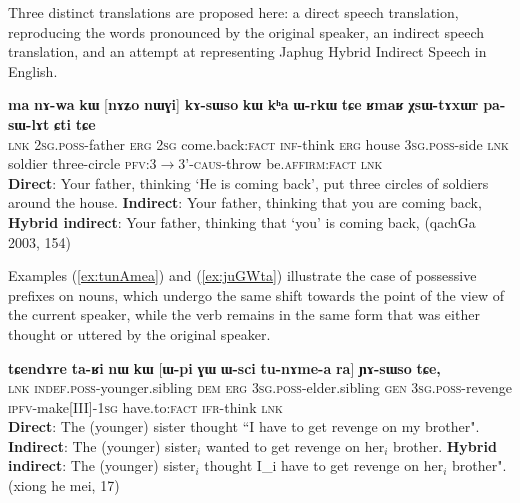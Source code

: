 \documentclass[oneside,a4paper,11pt]{article}
\newcommand{\ipa}[1]{\textbf{\phon#1}} %
\newcommand{\bleu}[1]{{\color{blue}#1}}
\newcommand{\rouge}[1]{{\color{red}#1}}
\newcommand{\refb}[1]{(\ref{#1})}
\begin{document}
Three distinct translations are proposed here: a direct speech translation, reproducing the words pronounced by the original speaker, an indirect speech translation, and an attempt at representing Japhug Hybrid Indirect Speech in English.

\begin{exe}
\ex \label{ex:nWGi.kAsWso}
\gll 
\ipa{ma} \ipa{nɤ-wa}  	\ipa{kɯ}  	[\rouge{\ipa{nɤʑo}} 	\bleu{\ipa{nɯɣi}}]  	\ipa{kɤ-sɯso}  	\ipa{kɯ}  	\ipa{kʰa}  	\ipa{ɯ-rkɯ} \ipa{tɕe} 	\ipa{ʁmaʁ}  	\ipa{χsɯ-tɤxɯr}  	\ipa{pa-sɯ-lɤt}  	\ipa{ɕti}  	\ipa{tɕe}  \\
\textsc{lnk} \textsc{2sg.poss}-father \textsc{erg} \textsc{2sg} {come.back:\textsc{fact}}  \textsc{inf}-think \textsc{erg} house \textsc{3sg.poss}-side \textsc{lnk} soldier three-circle \textsc{pfv:3$\rightarrow$3'-caus}-throw be.\textsc{affirm}:\textsc{fact} \textsc{lnk}\\
\glt \textbf{Direct}: Your father, thinking `\bleu{He is coming back}',   put three circles of soldiers around the house. 
\glt  \textbf{Indirect}: Your father, thinking that \rouge{you are coming back},
\glt  \textbf{Hybrid indirect}: Your father, thinking that `\rouge{you}' \bleu{is coming back}, (qachGa 2003, 154)
\end{exe}
   
Examples \refb{ex:tunAmea} and \refb{ex:juGWta} illustrate the case of possessive prefixes on nouns, which undergo the same shift towards the point of the view of the current speaker, while the verb remains in the same form that was either thought or uttered by the original speaker.

\begin{exe}
\ex \label{ex:tunAmea}
\gll  \ipa{tɕendɤre}  	\ipa{ta-ʁi}  	\ipa{nɯ}  	\ipa{kɯ}  	[\rouge{\ipa{ɯ-pi}}  	\ipa{ɣɯ}  	\ipa{ɯ-sci}  	\bleu{\ipa{tu-nɤme-a}}  	\ipa{ra}] 	\ipa{ɲɤ-sɯso}  	\ipa{tɕe,}  	\\
\textsc{lnk}  \textsc{indef.poss}-younger.sibling \textsc{dem} \textsc{erg}  {\textsc{3sg.poss}-elder.sibling}  \textsc{gen} \textsc{3sg.poss}-revenge {\textsc{ipfv}-make[III]-\textsc{1sg}} have.to:\textsc{fact} \textsc{ifr}-think \textsc{lnk} \\
\glt  \textbf{Direct}: The (younger) sister thought ``\bleu{I have to get revenge} on {my brother}".
\glt  \textbf{Indirect}:  The (younger) sister$_i$ \rouge{wanted to get revenge on her$_i$ brother}.
\glt  \textbf{Hybrid indirect}:  The (younger) sister$_i$ thought \bleu{I_i have to get revenge} on \rouge{her$_i$ brother}". (xiong he mei, 17)
  \end{exe}
  
\end{document}
